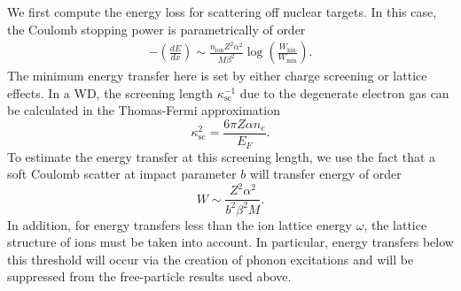\documentclass[twocolumn,showpacs,preprintnumbers,amsmath,amssymb,prd]{revtex4}
\def\r{\right)}
\def\l{\left(}
\begin{document}
\begin{appendices}
We first compute the energy loss for scattering off nuclear targets.
In this case, the Coulomb stopping power is parametrically of order
\begin{align}
\label{eq:SP}
  - \l \frac{dE}{dx}\r \sim \frac{n_\text{ion} Z^2 \alpha^2}{M \beta^2} 
    \log {\l\frac{W_\text{kin}}{W_\text{min}}\r}.
\end{align}
The minimum energy transfer here is set by either charge screening or lattice effects.  
In a WD, the screening length $\kappa_{\text{sc}}^{-1}$ due to the degenerate electron gas can be calculated in the Thomas-Fermi approximation \cite{Teukolsky}
\begin{equation}
\label{eq:TF}
\kappa_{\text{sc}}^{2} = \frac{6 \pi Z \alpha n_e}{E_F}.
\end{equation}
To estimate the energy transfer at this screening length, we use the fact that a soft Coulomb scatter at impact parameter $b$ will transfer energy of order
\begin{equation}
\label{eq:impact}
  W \sim \frac{Z^2 \alpha^2}{b^2 \beta^2 M}.
\end{equation}
In addition, for energy transfers less than the ion lattice energy $\omega$, the lattice structure of ions must be taken into account. 
In particular, energy transfers below this threshold will occur via the creation of phonon excitations and will be suppressed from the free-particle results used above. 



\end{appendices}
\end{document}
